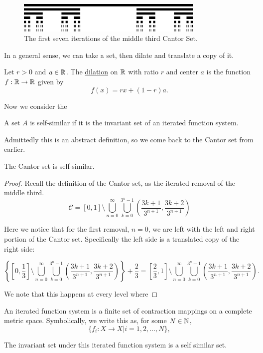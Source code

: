 \begin{figure}[h]
    \includegraphics[width=0.8\textwidth]{Content/Images/Cantor_set_in_seven_iterations.jpg}
    \centering
    \caption{The first seven iterations of the middle third Cantor Set.}
\end{figure}
In a general sense, we can take a set, then dilate and translate a copy of it. 

\begin{definition}[Dilation]
    Let $r>0$ and $a \in \mathbb{R}$.  The \underline{dilation} on $\mathbb{R}$ with ratio $r$ and center $a$ is the function $f: \mathbb{R} \to \mathbb{R}$ given by $$f(x)= rx + (1-r) a.$$
\end{definition}

Now we consider the 

\begin{definition}
    A set $A$ is self-similar if it is the invariant set of an iterated function system. 
\end{definition}

Admittedly this is an abstract definition, so we come back to the Cantor set from earlier.  
\begin{claim}The Cantor set is self-similar.   
\end{claim}
\begin{proof}
    Recall the definition of the Cantor set, as the iterated removal of the middle third.      
    $$\mathcal{C} = [0,1] \setminus \bigcup_{n=0}^\infty\bigcup_{k=0}^{3^n-1}\left(\frac{3k+1}{3^{n+1}},\frac{3k+2}{3^{n+1}}\right)$$

    Here we notice that for the first removal, $n = 0$, we are left with the left and right portion of the Cantor set.  Specifically the left side is a translated copy of the right side:

    $$\left\{ \left[0,\frac{1}{3}\right] \setminus \bigcup_{n=0}^\infty\bigcup_{k=0}^{3^n-1}\left(\frac{3k+1}{3^{n+1}},\frac{3k+2}{3^{n+1}}\right) \right\} + \frac{2}{3} = \left[\frac{2}{3},1\right] \setminus \bigcup_{n=0}^\infty\bigcup_{k=0}^{3^n-1}\left(\frac{3k+1}{3^{n+1}},\frac{3k+2}{3^{n+1}}\right).$$

    We note that this happens at every level where 

\end{proof}
\begin{definition}
    An iterated function system is a finite set of contraction mappings on a complete metric space.  Symbolically, we write this as, for some $N \in \mathbb{N}$,
    $$\{f_i:X \to X \vert i = 1,2,\dots, N\}, $$
\end{definition}

The invariant set under this iterated function system is a self similar set.